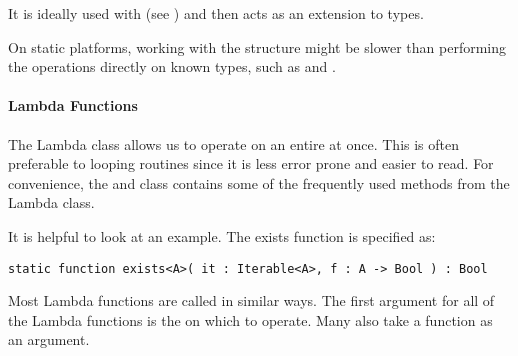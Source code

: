
It is ideally used with  (see ) and then acts as an extension to  types. 

On static platforms, working with the  structure might be slower than performing the operations directly on known types, such as  and .

\paragraph{Lambda Functions}
The Lambda class allows us to operate on an entire  at once.
This is often preferable to looping routines since it is less error prone and easier to read. 
For convenience, the  and  class contains some of the frequently used methods from the Lambda class.

It is helpful to look at an example. The exists function is specified as:

\begin{lstlisting}
static function exists<A>( it : Iterable<A>, f : A -> Bool ) : Bool
\end{lstlisting}

Most Lambda functions are called in similar ways. The first argument for all of the Lambda functions is the  on which to operate. Many also take a function as an argument.

